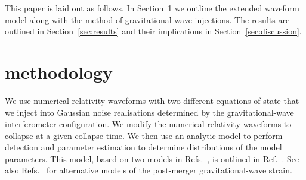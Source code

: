 \documentclass[
reprint,
prd,
twocolumn,
nofootinbib,
tightenlines %
floatfix,
 amsmath,
showpacs ,amssymb, aps,%
superscriptaddress
]{revtex4-1}
\begin{document}
    This paper is laid out as follows. In Section~\ref{sec:methodology} we outline the extended waveform model along with the method of gravitational-wave injections.
    The results are outlined in Section~\ref{sec:results} and their implications in Section~\ref{sec:discussion}.
    \vspace{-0.25cm}
    \section{methodology}\label{sec:methodology}
    We use numerical-relativity waveforms with two different equations of state that we inject into Gaussian noise realisations determined by the gravitational-wave interferometer configuration.
    We modify the numerical-relativity waveforms to collapse at a given collapse time.
    We then use an analytic model to perform detection and parameter estimation to determine distributions of the model parameters.
    This model, based on two models in Refs.~\cite{Bauswein2016,Bose2018}, is outlined in Ref.~\cite{Easter2020}.
    See also Refs.~\cite{Tsang2019,Breschi2019} for alternative models of the post-merger gravitational-wave strain.
 
\end{document}
